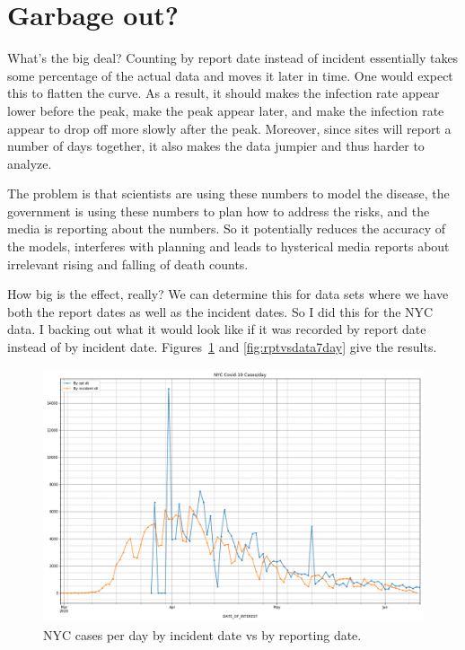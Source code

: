 \documentclass[10pt,reqno]{amsart}
\begin{document}

\section{Garbage out?}

What's the big deal?  Counting by report date instead of incident
essentially takes some percentage of the actual data and moves it
later in time.  One would expect this to flatten the curve.  As a
result, it should makes the infection rate appear lower before the
peak, make the peak appear later, and make the infection rate appear
to drop off more slowly after the peak.  Moreover, since sites will
report a number of days together, it also makes the data jumpier and
thus harder to analyze.

The problem is that scientists are using these numbers to model the
disease, the government is using these numbers to plan
how to address the risks, and the media is reporting about the
numbers.  So it potentially reduces the accuracy of the models, interferes with
planning and leads to hysterical media reports about irrelevant rising
and falling of death counts.

How big is the effect, really?  We can determine this for data sets
where we have both the report dates as well as the incident dates.  So
I did this for the NYC data.  I backing out what it would look like if
it was recorded by report date instead of by incident date.
Figures~\ref{fig:rptvsdataraw} and \ref{fig:rptvsdata7day} give the
results.

\begin{figure}[H]
  \centering
  \includegraphics[width=\textwidth]{../Notebooks/casesPerDayHistoryRptDtVsInDtRaw.png}
  \caption{NYC cases per day by incident date vs by reporting date.}
  \label{fig:rptvsdataraw}
\end{figure}
\end{document}

